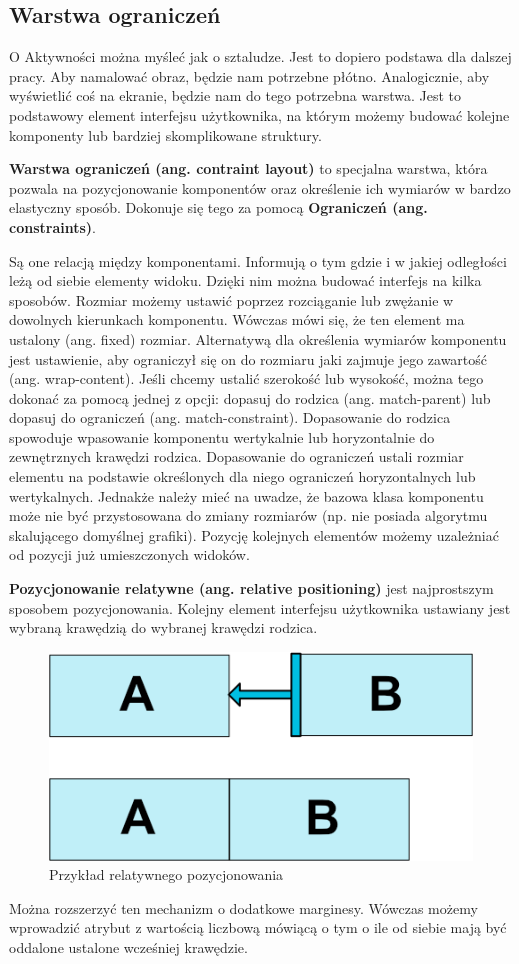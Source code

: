 \subsection{Warstwa ograniczeń}
O Aktywności można myśleć jak o sztaludze. Jest to dopiero podstawa dla dalszej pracy. Aby namalować obraz, będzie nam potrzebne płótno. Analogicznie, aby wyświetlić coś na ekranie, będzie nam do tego potrzebna warstwa. Jest to podstawowy element interfejsu użytkownika, na którym możemy budować kolejne komponenty lub bardziej skomplikowane struktury.\par\textbf{Warstwa ograniczeń (ang. contraint layout)} to specjalna warstwa, która pozwala na pozycjonowanie komponentów oraz określenie ich wymiarów w bardzo elastyczny sposób. Dokonuje się tego za pomocą \textbf{Ograniczeń (ang. constraints)}.\par Są one relacją między komponentami. Informują o tym gdzie i w jakiej odległości leżą od siebie elementy widoku. Dzięki nim można budować interfejs na kilka sposobów. Rozmiar możemy ustawić poprzez rozciąganie lub zwężanie w dowolnych kierunkach komponentu. Wówczas mówi się, że ten element ma ustalony (ang. fixed) rozmiar. Alternatywą dla określenia wymiarów komponentu jest ustawienie, aby ograniczył się on do rozmiaru jaki zajmuje jego zawartość (ang. wrap-content). Jeśli chcemy ustalić szerokość lub wysokość, można tego dokonać za pomocą jednej z opcji: dopasuj do rodzica (ang. match-parent) lub dopasuj do ograniczeń (ang. match-constraint). Dopasowanie do rodzica spowoduje wpasowanie komponentu wertykalnie lub horyzontalnie do zewnętrznych krawędzi rodzica. Dopasowanie do ograniczeń ustali rozmiar elementu na podstawie określonych dla niego ograniczeń horyzontalnych lub wertykalnych. Jednakże należy mieć na uwadze, że bazowa klasa komponentu może nie być przystosowana do zmiany rozmiarów (np. nie posiada algorytmu skalującego domyślnej grafiki). Pozycję kolejnych elementów możemy uzależniać od pozycji już umieszczonych widoków.\par \textbf{Pozycjonowanie relatywne (ang. relative positioning)} jest najprostszym sposobem pozycjonowania. Kolejny element interfejsu użytkownika ustawiany jest wybraną krawędzią do wybranej krawędzi rodzica. 
\begin{figure}[H]
\centering
\includegraphics[scale=0.7]{imgs/relative-positioning.png}
\caption{Przykład relatywnego pozycjonowania\cite{constraintlayout}}
\end{figure} Można rozszerzyć ten mechanizm o dodatkowe marginesy. Wówczas możemy wprowadzić atrybut z wartością liczbową mówiącą o tym o ile od siebie mają być oddalone ustalone wcześniej krawędzie. \cite{constraintlayout}
